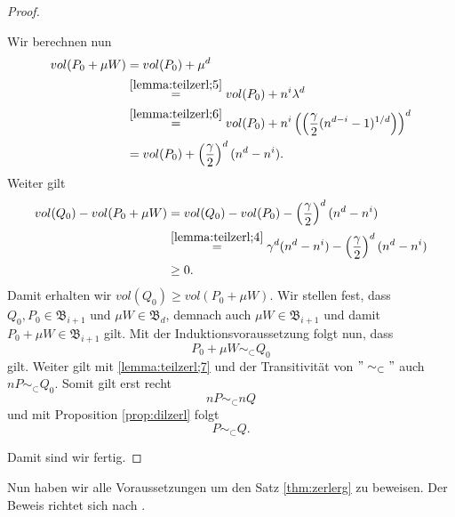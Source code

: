 \documentclass[11pt,titlepage]{article}
\theoremstyle{definition}
\theoremstyle{remark}
\begin{document}
\begin{proof}
\begin{itemize}
			Wir berechnen nun
			\begin{align*}
				vol(P_0+\mu W) &= vol(P_0)+\mu^d \\
				&\overset{\ref{lemma:teilzerl;5}}{=} vol(P_0)+n^i\lambda^d \\
				&\overset{\ref{lemma:teilzerl;6}}{=}
				 vol(P_0)+n^i\left(\left(\frac{\gamma}{2}
				(n^{d-i}-1)^{1/d}\right)\right)^d \\
				&=vol(P_0)+\left(\frac{\gamma}{2}\right)^d (n^d-n^i).
			\end{align*}
			Weiter gilt 
			\begin{align*}
				vol(Q_0)-vol(P_0+\mu W)&= vol(Q_0)-vol(P_0)-
				\left(\frac{\gamma}{2}\right)^d (n^d-n^i) \\
				&\overset{\ref{lemma:teilzerl;4}}{=} \gamma^d(n^d-n^i)-
				\left(\frac{\gamma}{2}\right)^d (n^d-n^i) \\
				&\geq 0.
			\end{align*}
			Damit erhalten wir $vol(Q_0)\geq vol(P_0+\mu W)$. Wir stellen fest, 
			dass $Q_0,P_0\in\mathfrak{B}_{i+1}$ und $\mu W\in \mathfrak{B}_d$, 
			demnach auch $\mu W\in\mathfrak{B}_{i+1}$ und damit  
			$P_0+\mu W\in\mathfrak{B}_{i+1}$ gilt. Mit der Induktionsvoraussetzung 
			folgt nun, dass 
			\[P_0+\mu W\sim_{\subset} Q_0\]
			gilt. Weiter gilt mit \ref{lemma:teilzerl;7} und der Transitivität von $"\sim_{\subset}"$ auch $nP\sim_{\subset}Q_0$. 
			Somit gilt erst recht 
			\[nP\sim_{\subset}nQ\]
			und mit Proposition \ref{prop:dilzerl} folgt
			\[P\sim_{\subset}Q.\]
		\end{itemize}
	Damit sind wir fertig.
	\end{proof}
	
	Nun haben wir alle Voraussetzungen um den Satz \ref{thm:zerlerg} zu 
	beweisen. Der Beweis richtet sich nach \cite[Satz III]{Hadwiger}.
	
\end{document}
